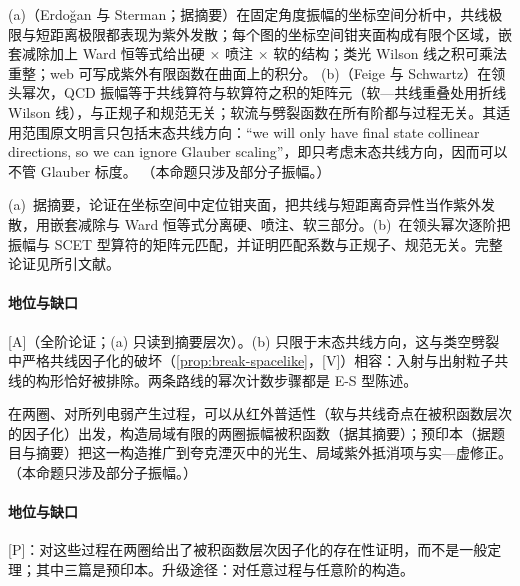 \begin{proposition}\label{prop:front-coordinate-space}
(a)（Erdoğan 与 Sterman；据摘要）在固定角度振幅的坐标空间分析中，共线极限与短距离极限都表现为紫外发散；每个图的坐标空间钳夹面构成有限个区域，嵌套减除加上 Ward 恒等式给出硬 $\times$ 喷注 $\times$ 软的结构；类光 Wilson 线之积可乘法重整；web 可写成紫外有限函数在曲面上的积分\cite{Erdogan:2013bga,Erdogan:2014gha,Erdogan:2017gyf,Sterman:2025qsq}。
(b)（Feige 与 Schwartz）在领头幂次，QCD 振幅等于共线算符与软算符之积的矩阵元（软—共线重叠处用折线 Wilson 线），与正规子和规范无关；软流与劈裂函数在所有阶都与过程无关\cite{FeigeSchwartz2014}。其适用范围原文明言只包括末态共线方向：“we will only have final state collinear directions, so we can ignore Glauber scaling”，即只考虑末态共线方向，因而可以不管 Glauber 标度。
（本命题只涉及部分子振幅。）
\end{proposition}

\begin{proofsketch}
(a)~据摘要，论证在坐标空间中定位钳夹面，把共线与短距离奇异性当作紫外发散，用嵌套减除与 Ward 恒等式分离硬、喷注、软三部分。(b)~在领头幂次逐阶把振幅与 SCET 型算符的矩阵元匹配，并证明匹配系数与正规子、规范无关。完整论证见所引文献。
\end{proofsketch}

\paragraph{地位与缺口}[A]（全阶论证；(a) 只读到摘要层次）。(b) 只限于末态共线方向，这与类空劈裂中严格共线因子化的破坏（\cref{prop:break-spacelike}，[V]）相容：入射与出射粒子共线的构形恰好被排除。两条路线的幂次计数步骤都是 E-S 型陈述。

\begin{proposition}\label{prop:front-local-ir}
在两圈、对所列电弱产生过程，可以从红外普适性（软与共线奇点在被积函数层次的因子化）出发，构造局域有限的两圈振幅被积函数（据其摘要）\cite{Anastasiou:2018rib,Anastasiou:2020sdt,Anastasiou:2022eym,Anastasiou:2024xvk}；预印本\cite{Anastasiou:2025cvy,Anastasiou:2026kpm,Anastasiou:2026jta}（据题目与摘要）把这一构造推广到夸克湮灭中的光生、局域紫外抵消项与实—虚修正。（本命题只涉及部分子振幅。）
\end{proposition}

\paragraph{地位与缺口}[P]：对这些过程在两圈给出了被积函数层次因子化的存在性证明，而不是一般定理；其中三篇是预印本。升级途径：对任意过程与任意阶的构造。

